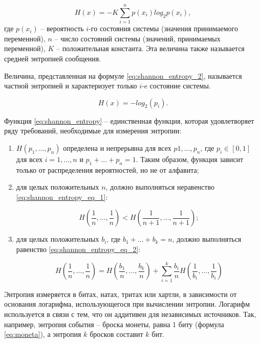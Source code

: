 \begin{equation}\label{eq:shannon_entropy}
	H(x) = -K\sum^n_{i=1}p(x_{i})log_2{p(x_{i})},
\end{equation}
где $p(x_{i})$ -- вероятность $i$-го состояния системы (значения принимаемого переменной), $n$ -- число состояний системы (значений, принимаемых переменной), $K$ -- положительная константа. Эта величина также называется средней энтропией сообщения. 

Величина, представленная на формуле \ref{eq:shannon_entropy_2}, называется частной энтропией и характеризует только $i$-e состояние системы.

\begin{equation}\label{eq:shannon_entropy_2}
	H(x) = -log_{2}{(p_{i})}.
\end{equation}

Функция \ref{eq:shannon_entropy} -- единственная функция, которая удовлетворяет ряду требований, необходимые для измерения энтропии:

\begin{enumerate}
	\item $H(p_{1},...,p_{n})$ определена и непрерывна для всех $p1,...,p_{n}$, где $p_{i} \in [0, 1]$ для всех $i=1,...,n$ и $p_{1}+...+p_{n} = 1$. Таким образом, функция зависит только от распределения вероятностей, но не от алфавита;
	\item для целых положительных $n$, должно выполняться неравенство \ref{eq:shannon_entropy_eq_1}:
	
	\begin{equation}\label{eq:shannon_entropy_eq_1}
		H(\frac{1}{n},...,\frac{1}{n}) < H(\frac{1}{n + 1},...,\frac{1}{n + 1});
	\end{equation}
	
	\item для целых положительных $b_{i}$, где $b_{1} + ... + b_{k} = n$, должно выполняться равенство \ref{eq:shannon_entropy_eq_2}:
	
	\begin{equation}\label{eq:shannon_entropy_eq_2}
		H(\frac{1}{n},...,\frac{1}{n}) = H(\frac{b_{1}}{n},...,\frac{b_{k}}{n}) + \sum^k_{i = 1}\frac{b_{i}}{n}H(\frac{1}{b_{i}},...,\frac{1}{b_{i}})
	\end{equation}
\end{enumerate}

Энтропия измеряется в битах, натах, тритах или хартли, в зависимости от основания логарифма, использующегося при вычислении энтропии. Логарифм используется в связи с тем, что он аддитивен для независимых источников. Так, например, энтропия события -- броска монеты, равна 1 биту (формула \ref{eq:moneta}), а энтропия $k$ бросков составит $k$ бит. 

